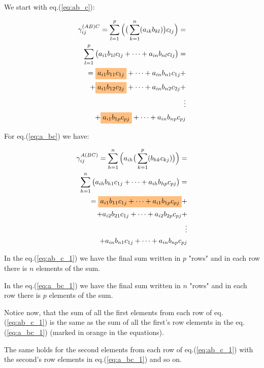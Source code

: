 \documentclass[10pt,twocolumn]{article}
\newcommand{\highlight}[1]{%
  \colorbox{orange!50}{$\displaystyle#1$}}
\begin{document}
We start with eq.(\ref{eq:ab_c}):

\begin{equation} \label{eq:ab_c_1}
\begin{split}
\gamma_{ij}^{(AB)C} = \sum_{l=1}^{p} \Big( \big( \sum_{k=1}^{n} (a_{ik} b_{kl}) \big) c_{lj} \Big) = \\
\sum_{l=1}^{p} \big( a_{i1} b_{1l} c_{lj} + \dots + a_{in} b_{nl} c_{lj} \big) = \\ 
= \highlight{a_{i1} b_{11} c_{1j}} + \dots + a_{in} b_{n1} c_{1j} + \\ 
+ \highlight{a_{i1} b_{12} c_{2j}} + \dots + a_{in} b_{n2} c_{2j} + \\ 
\vdots \\ 
+ \highlight{a_{i1} b_{1p} c_{pj}} + \dots + a_{in} b_{np} c_{pj}
\end{split}
\end{equation}

For eq.(\ref{eq:a_bc}) we have:

\begin{equation} \label{eq:a_bc_1}
\begin{split}
\gamma_{ij}^{A(BC)} = \sum_{h=1}^{n} \Big(  a_{ih} \big( \sum_{k=1}^{p} (b_{hk} c_{kj}) \big) \Big) = \\
 \sum_{h=1}^{n}  \big( a_{ih} b_{h1} c_{1j} + \dots + a_{ih} b_{hp} c_{pj}   \big) = \\
= \highlight{a_{i1} b_{11} c_{1j} + \dots + a_{i1} b_{1p} c_{pj}} + \\ 
+ a_{i2} b_{21} c_{1j} + \dots + a_{i2} b_{2p} c_{pj} + \\ 
\vdots \\ 
+ a_{in} b_{n1} c_{1j} + \dots + a_{in} b_{np} c_{pj}
\end{split}
\end{equation}

In the eq.(\ref{eq:ab_c_1}) we have the final sum written in $p$ "rows" and in each row there is $n$ elements of the sum.

In the eq.(\ref{eq:a_bc_1}) we have the final sum written in $n$ "rows" and in each row there is $p$ elements of the sum.

Notice now, that the sum of all the first elements from each row of eq.(\ref{eq:ab_c_1}) is the same as the sum of all the first's row elements in the eq.(\ref{eq:a_bc_1}) (marked in orange in the equations).

The same holds for the second elements from each row of eq.(\ref{eq:ab_c_1}) with the second's row elements in eq.(\ref{eq:a_bc_1}) and so on.
\end{document}
